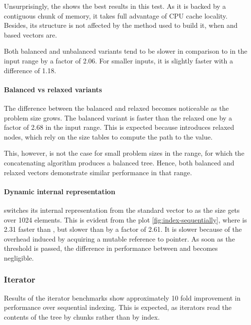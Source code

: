 Unsurprisingly, the \stdvec{} shows the best results in this test. As it is backed by a contiguous chunk of memory, it takes full advantage of CPU cache locality. Besides, its structure is not affected by the method used to build it, when \rbtree{} and \rrbtree{} based vectors are.

Both balanced and unbalanced \imrsvec{} variants tend to be slower in comparison to \rrbvec{} in the \range{[100, \mega{1}]} input range by a factor of 2.06. For smaller inputs, \rrbvec{} it is slightly faster with a difference of 1.18. 

\paragraph{Balanced vs relaxed variants}
The difference between the balanced \rbvec{} and relaxed \rrbvec{} becomes noticeable as the problem size grows. The balanced variant is faster than the relaxed one by a factor of 2.68 in the \range{[100, \mega{1}]} input range. This is expected because \rrbvec{} introduces relaxed nodes, which rely on the size tables to compute the path to the value. 

This, however, is not the case for small problem sizes in the \range{[0, 100]} range, for which the concatenating algorithm produces a balanced tree. Hence, both balanced and relaxed vectors demonstrate similar performance in that range. 

\paragraph{Dynamic internal representation}
\pvec{} switches its internal representation from the standard vector to \rrbvec{} as the size gets over 1024 elements. This is evident from the plot \ref{fig:index-sequentially}, where \pvec{} is 2.31 faster than \rbvec{}, but slower than \stdvec{} by a factor of 2.61. It is slower because of the overhead induced by acquiring a mutable reference to \rc{} pointer. As soon as the threshold is passed, the difference in performance between \pvec{} and \rrbvec{} becomes negligible. 

\subsubsection*{Iterator}
Results of the iterator benchmarks show approximately 10 fold improvement in performance over sequential indexing. This is expected, as iterators read the contents of the tree by chunks rather than by index. 

